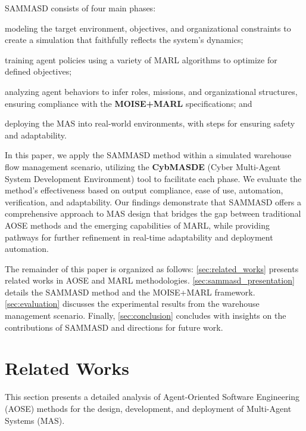 \documentclass[sigconf,anonymous]{aamas}
\begin{document}
SAMMASD consists of four main phases:
\begin{itemize*}[]
  \item modeling the target environment, objectives, and organizational constraints to create a simulation that faithfully reflects the system's dynamics; 
  \item training agent policies using a variety of MARL algorithms to optimize for defined objectives; 
  \item analyzing agent behaviors to infer roles, missions, and organizational structures, ensuring compliance with the \textbf{MOISE+MARL} specifications; and 
  \item deploying the MAS into real-world environments, with steps for ensuring safety and adaptability.
\end{itemize*}

In this paper, we apply the SAMMASD method within a simulated warehouse flow management scenario, utilizing the \textbf{CybMASDE} (Cyber Multi-Agent System Development Environment) tool to facilitate each phase. We evaluate the method's effectiveness based on output compliance, ease of use, automation, verification, and adaptability. Our findings demonstrate that SAMMASD offers a comprehensive approach to MAS design that bridges the gap between traditional AOSE methods and the emerging capabilities of MARL, while providing pathways for further refinement in real-time adaptability and deployment automation.

The remainder of this paper is organized as follows: \autoref{sec:related_works} presents related works in AOSE and MARL methodologies. \autoref{sec:sammasd_presentation} details the SAMMASD method and the MOISE+MARL framework. \autoref{sec:evaluation} discusses the experimental results from the warehouse management scenario. Finally, \autoref{sec:conclusion} concludes with insights on the contributions of SAMMASD and directions for future work.


\section{Related Works}
\label{sec:related_works}

This section presents a detailed analysis of Agent-Oriented Software Engineering (AOSE) methods for the design, development, and deployment of Multi-Agent Systems (MAS).
\end{document}
